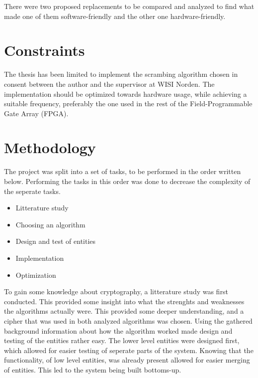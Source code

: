 There were two proposed replacements to be compared and analyzed 
to find what made one of them software-friendly and the other one 
hardware-friendly. 

\section{Constraints}
The thesis has been limited to implement the scrambing algorithm chosen 
in consent between the author and the supervisor at WISI Norden. The 
implementation should be optimized towards hardware usage, while 
achieving a suitable frequency, preferably the one used in the rest of 
the Field-Programmable Gate Array (FPGA).


\section{Methodology}
The project was split into a set of tasks, to be performed in the order 
written below. Performing the tasks in this order was done to decrease 
the complexity of the seperate tasks.

\begin{itemize}
\item Litterature study
\item Choosing an algorithm
\item Design and test of entities
\item Implementation
\item Optimization
\end{itemize}

To gain some knowledge about cryptography, a litterature study was 
first conducted. This provided some insight into what the strenghts and 
weaknesses the algorithms actually were. This provided some deeper 
understanding, and a cipher that was used in both analyzed algorithms 
was chosen. Using the gathered background information about how the 
algorithm worked made design and testing of the entities rather easy. 
The lower level entities were designed first, which allowed for easier 
testing of seperate parts of the system. 
Knowing that the functionality, of low level entities, was already 
present allowed for easier merging of entities. This led to the system 
being built bottoms-up.


